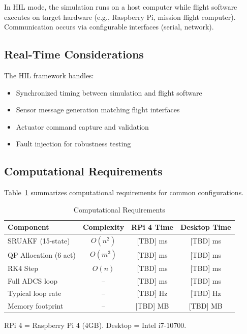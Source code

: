 \documentclass[conference]{IEEEtran}
\begin{document}
In HIL mode, the simulation runs on a host computer while flight software executes on target hardware (e.g., Raspberry Pi, mission flight computer). Communication occurs via configurable interfaces (serial, network).

\subsection{Real-Time Considerations}\label{subsec:realtime}

The HIL framework handles:
\begin{itemize}
    \item Synchronized timing between simulation and flight software
    \item Sensor message generation matching flight interfaces
    \item Actuator command capture and validation
    \item Fault injection for robustness testing
\end{itemize}

\subsection{Computational Requirements}\label{subsec:hil_compute}


Table~\ref{tab:computational} summarizes computational requirements for common configurations.

\begin{table}[t]
    \centering
    \caption{Computational Requirements}
    \label{tab:computational}
    \begin{tabular}{lccc}
        \toprule
        Component & Complexity & RPi 4 Time & Desktop Time \\
        \midrule
        SRUAKF (15-state) & $O(n^2)$ & [TBD] ms & [TBD] ms \\
        QP Allocation (6 act) & $O(m^3)$ & [TBD] ms & [TBD] ms \\
        RK4 Step & $O(n)$ & [TBD] ms & [TBD] ms \\
        Full ADCS loop & -- & [TBD] ms & [TBD] ms \\
        \midrule
        Typical loop rate & -- & [TBD] Hz & [TBD] Hz \\
        Memory footprint & -- & [TBD] MB & [TBD] MB \\
        \bottomrule
    \end{tabular}
    \begin{flushleft}
    \small RPi 4 = Raspberry Pi 4 (4GB). Desktop = Intel i7-10700.
    \end{flushleft}
\end{table}
\end{document}
